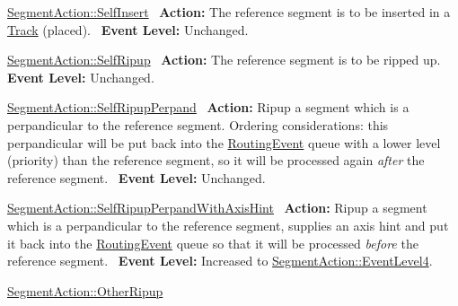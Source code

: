 \begin{DoxyItemize}
\item \mbox{\hyperlink{classKite_1_1SegmentAction_a1d1cfd8ffb84e947f82999c682b666a7a930d0718b2afc37983ffe708f8261b19}{Segment\+Action\+::\+Self\+Insert}}~\newline
 {\bfseries Action\+:} The reference segment is to be inserted in a \mbox{\hyperlink{classKite_1_1Track}{Track}} (placed).~\newline
 {\bfseries Event Level\+:} Unchanged.
\item \mbox{\hyperlink{classKite_1_1SegmentAction_a1d1cfd8ffb84e947f82999c682b666a7a837e07a8b4101cff32018683072f2d78}{Segment\+Action\+::\+Self\+Ripup}}~\newline
 {\bfseries Action\+:} The reference segment is to be ripped up.~\newline
 {\bfseries Event Level\+:} Unchanged.
\item \mbox{\hyperlink{classKite_1_1SegmentAction_a1d1cfd8ffb84e947f82999c682b666a7a85fd77114c99a0827e08de2fc6a53ed7}{Segment\+Action\+::\+Self\+Ripup\+Perpand}}~\newline
 {\bfseries Action\+:} Ripup a segment which is a perpandicular to the reference segment. Ordering considerations\+: this perpandicular will be put back into the \mbox{\hyperlink{classKite_1_1RoutingEvent}{Routing\+Event}} queue with a lower level (priority) than the reference segment, so it will be processed again {\itshape after} the reference segment.~\newline
 {\bfseries Event Level\+:} Unchanged.
\item \mbox{\hyperlink{classKite_1_1SegmentAction_a1d1cfd8ffb84e947f82999c682b666a7ae30745ee276038ba4d7b5f92d80f3715}{Segment\+Action\+::\+Self\+Ripup\+Perpand\+With\+Axis\+Hint}}~\newline
 {\bfseries Action\+:} Ripup a segment which is a perpandicular to the reference segment, supplies an axis hint and put it back into the \mbox{\hyperlink{classKite_1_1RoutingEvent}{Routing\+Event}} queue so that it will be processed {\itshape before} the reference segment.~\newline
 {\bfseries Event Level\+:} Increased to \mbox{\hyperlink{classKite_1_1SegmentAction_a1d1cfd8ffb84e947f82999c682b666a7ab8346062d5bbccb98893c4675b8d5098}{Segment\+Action\+::\+Event\+Level4}}.
\item \mbox{\hyperlink{classKite_1_1SegmentAction_a1d1cfd8ffb84e947f82999c682b666a7a22374bab829fac7d12af4784d80eeb6e}{Segment\+Action\+::\+Other\+Ripup}}~\newline

\end{DoxyItemize}
